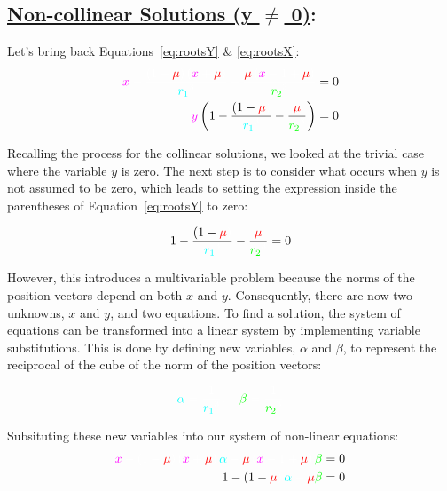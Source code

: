 \documentclass{article}
\newcommand{\cw}{\color{white}}
\newcommand{\cm}{\color{magenta}}
\newcommand{\cc}{\color{cyan}}
\newcommand{\cred}{\color{red}}
\newcommand{\cg}{\color{green}}
\newcommand{\ddfrac}[2]{\frac{\displaystyle #1}{\displaystyle #2}}
\begin{document}
\subsection*{\underline{Non-collinear Solutions (y $\neq$ 0)}:}

Let's bring back Equations~\eqref{eq:rootsY} \& \eqref{eq:rootsX}:
\begin{align*}
    \cm x \cw - \ddfrac{\left(1 - \cred \mu \cw \right) \left(\cm x \cw + \cred \mu \cw\right)}{\cc r_1 \cw ^3} - \ddfrac{\cred \mu \cw \left(\cm x \cw - 1 + \cred\mu\cw\right)}{\cg r_2 \cw ^3} &= 0
    \\
    \textcolor{magenta}{y} \left( 1 - \ddfrac{\left(1-\cred\mu\cw\right)}{\cc r_1 \cw ^3} - \ddfrac{\cred\mu\cw}{\cg r_2 \cw ^3} \right) &= 0
\end{align*}


Recalling the process for the collinear solutions, we looked at the trivial case where the variable $y$ is zero. The next step is to consider what occurs when $y$ is not assumed to be zero, which leads to setting the expression inside the parentheses of Equation~\eqref{eq:rootsY} to zero:

\begin{equation*}
    1 - \ddfrac{\left(1-\cred\mu\cw\right)}{\cc r_1 \cw ^3} - \ddfrac{\cred\mu\cw}{\cg r_2 \cw ^3} = 0 \\
\end{equation*}

However, this introduces a multivariable problem because the norms of the position vectors depend on both $x$ and $y$. Consequently, there are now two unknowns, $x$ and $y$, and two equations. To find a solution, the system of equations can be transformed into a linear system by implementing variable substitutions. This is done by defining new variables, $\alpha$ and $\beta$, to represent the reciprocal of the cube of the norm of the position vectors:

\begin{equation*}
    \cc \alpha \cw = \ddfrac{1}{\cc r_1 \cw ^3}, \quad \cg \beta \cw = \ddfrac{1}{\cg r_2 \cw ^3}
\end{equation*}

Subsituting these new variables into our system of non-linear equations:
\begin{align*}
    \cm x \cw - \left(1 - \cred \mu \cw \right) \left(\cm x \cw + \cred \mu \cw\right) \cc \alpha \cw 
    - \cred \mu \cw \left(\cm x \cw - 1 + \cred\mu\cw\right) \cg \beta \cw &= 0
    \\
    1 - \left(1-\cred\mu\cw\right) \cc \alpha \cw - \cred\mu\cw \cg \beta \cw &= 0
\end{align*}
\end{document}
